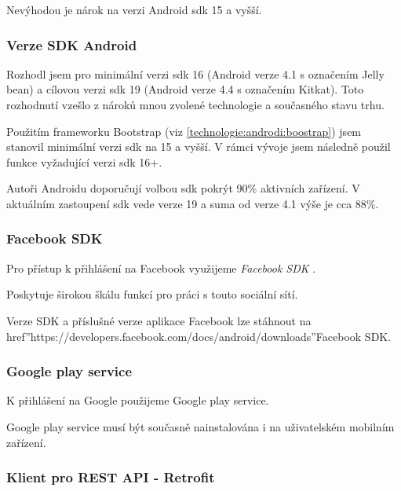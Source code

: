 \documentclass[thesis=B,czech]{FITthesis}[2012/06/26]
\begin{document}
Nevýhodou je nárok na verzi Android \acrshort{sdk} 15 a vyšší.


\subsubsection {Verze SDK Android}

Rozhodl jsem pro minimální verzi \acrshort{sdk} 16 (Android verze 4.1 s označením Jelly bean) a cílovou verzi \acrshort{sdk} 19 (Android verze 4.4 s označením Kitkat).
Toto rozhodnutí vzešlo z nároků mnou zvolené technologie a současného stavu trhu.

Použitím frameworku Bootstrap (viz \ref{technologie:androdi:boostrap}) jsem stanovil minimální verzi \acrshort{sdk} na 15 a vyšší. V rámci vývoje jsem následně použil funkce vyžadující verzi \acrshort{sdk} 16+.

Autoři Androidu doporučují volbou \acrshort{sdk} pokrýt 90\% aktivních zařízení\cite{android_sdk_recommendation}. V aktuálním zastoupení \acrshort{sdk} vede verze 19 a suma od verze 4.1 výše je cca 88\%\cite{android_sdk_graph}. 

\subsubsection {Facebook SDK}
\label{technology:facebook_sdk}
Pro přístup k přihlášení na Facebook využijeme \textit{Facebook SDK} \cite{design_facebook_sdk}.

Poskytuje širokou škálu funkcí pro práci s touto sociální sítí. 

Verze SDK a příslušné verze aplikace Facebook lze stáhnout na
href{''https://developers.facebook.com/docs/android/downloads''}{Facebook SDK}.

\subsubsection {Google play service}
\label{technology:google_play_service}

K přihlášení na Google použijeme Google play service\cite{design_google_play_service}.

Google play service musí být současně nainstalována i na uživatelském mobilním zařízení\cite{design_google_play_service_need}.

\subsubsection {Klient pro REST API - Retrofit}
\label{technology:android_client_for_restapi}
\end{document}
